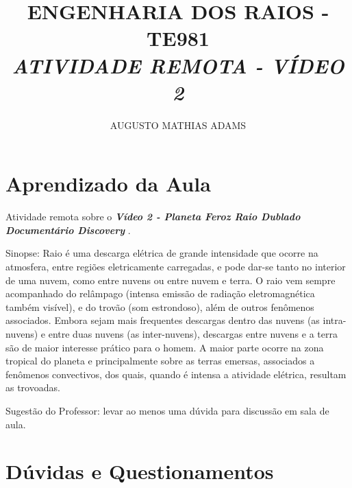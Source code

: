 \documentclass[a4paper, 12pt, onecolumn,singlespacing]{article}
\title{\normalsize{ENGENHARIA DOS RAIOS - TE981}\\ \huge{\textbf\textit{{ATIVIDADE REMOTA - VÍDEO 2}}\\}}
\author{\small{AUGUSTO MATHIAS ADAMS}}
\begin{document}
	
	\maketitle
	
	\section{Aprendizado da Aula}
	
	Atividade remota sobre o \textbf{\textit{Vídeo 2 - Planeta Feroz Raio Dublado Documentário Discovery }}.
	
	Sinopse: Raio é uma descarga elétrica de grande intensidade que ocorre na atmosfera, entre regiões eletricamente carregadas, e pode dar-se tanto no interior de uma nuvem, como entre nuvens ou entre nuvem e terra. O raio vem sempre acompanhado do relâmpago (intensa emissão de radiação eletromagnética também visível), e do trovão (som estrondoso), além de outros fenômenos associados. Embora sejam mais frequentes descargas dentro das nuvens (as intra-nuvens) e entre duas nuvens (as inter-nuvens), descargas entre nuvens e a terra são de maior interesse prático para o homem. A maior parte ocorre na zona tropical do planeta e principalmente sobre as terras emersas, associados a fenômenos convectivos, dos quais, quando é intensa a atividade elétrica, resultam as trovoadas.
	
	Sugestão do Professor: levar ao menos uma dúvida para discussão em sala de aula.
	
	\section{Dúvidas e Questionamentos}
	
\end{document}
